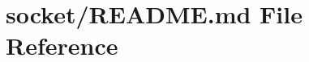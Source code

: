 \hypertarget{socket_2README_8md}{}\section{socket/\+R\+E\+A\+D\+ME.md File Reference}
\label{socket_2README_8md}
